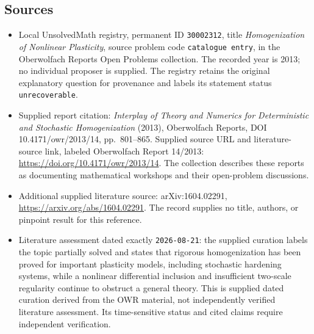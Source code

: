 \documentclass[11pt]{article}
\begin{document}
\subsection{Sources}
\begin{itemize}
\item Local UnsolvedMath registry, permanent ID \texttt{30002312}, title \emph{Homogenization of Nonlinear Plasticity}, source problem code \texttt{catalogue entry}, in the Oberwolfach Reports Open Problems collection. The recorded year is 2013; no individual proposer is supplied. The registry retains the original explanatory question for provenance and labels its statement status \texttt{unrecoverable}.
\item Supplied report citation: \emph{Interplay of Theory and Numerics for Deterministic and Stochastic Homogenization} (2013), Oberwolfach Reports, DOI 10.4171/owr/2013/14, pp.\ 801--865. Supplied source URL and literature-source link, labeled Oberwolfach Report 14/2013: \url{https://doi.org/10.4171/owr/2013/14}. The collection describes these reports as documenting mathematical workshops and their open-problem discussions.
\item Additional supplied literature source: arXiv:1604.02291, \url{https://arxiv.org/abs/1604.02291}. The record supplies no title, authors, or pinpoint result for this reference.
\item Literature assessment dated exactly \texttt{2026-08-21}: the supplied curation labels the topic partially solved and states that rigorous homogenization has been proved for important plasticity models, including stochastic hardening systems, while a nonlinear differential inclusion and insufficient two-scale regularity continue to obstruct a general theory. This is supplied dated curation derived from the OWR material, not independently verified literature assessment. Its time-sensitive status and cited claims require independent verification.
\end{itemize}
\end{document}
